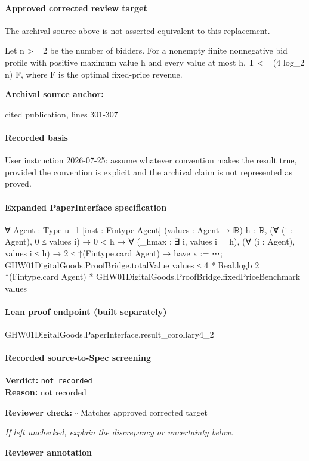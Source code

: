 \documentclass[10pt]{article}
\newcommand{\reviewerbox}{%
  \par\noindent\fbox{\parbox{0.96\linewidth}{\rule{0pt}{0.38in}}}\par
}
\newcommand{\reviewmatch}[1]{%
  \par\noindent\textbf{Reviewer check:} $\square$\; #1\par
  \noindent\emph{If left unchecked, explain the discrepancy or uncertainty below.}\par
}
\begin{document}
\paragraph{Approved corrected review target}
The archival source above is not asserted equivalent to this replacement.
\begin{ReviewVerbatim}
Let n >= 2 be the number of bidders. For a nonempty finite nonnegative bid profile with positive maximum value h and every value at most h, T <= (4 log_2 n) F, where F is the optimal fixed-price revenue.
\end{ReviewVerbatim}

\textbf{Archival source anchor:} {\footnotesize\raggedright cited publication, lines 301-\allowbreak{}307\par}
\paragraph{Recorded basis}
User instruction 2026-\allowbreak{}07-\allowbreak{}25:\allowbreak{} assume whatever convention makes the result true, provided the convention is explicit and the archival claim is not represented as proved.\allowbreak{}
\paragraph{Expanded PaperInterface specification}
\begin{ReviewVerbatim}
∀ {Agent : Type u_1} [inst : Fintype Agent] (values : Agent → ℝ) {h : ℝ},
  (∀ (i : Agent), 0 ≤ values i) →
    0 < h →
      ∀ (_hmax : ∃ i, values i = h),
        (∀ (i : Agent), values i ≤ h) →
          2 ≤ ↑(Fintype.card Agent) →
            have x := ⋯;
            GHW01DigitalGoods.ProofBridge.totalValue values ≤
              4 * Real.logb 2 ↑(Fintype.card Agent) * GHW01DigitalGoods.ProofBridge.fixedPriceBenchmark values
\end{ReviewVerbatim}

\paragraph{Lean proof endpoint (built separately)}\begin{ReviewVerbatim}
GHW01DigitalGoods.PaperInterface.result_corollary4_2
\end{ReviewVerbatim}

\paragraph{Recorded source-to-Spec screening}
\textbf{Verdict:} \texttt{not recorded}
\\
\textbf{Reason:} not recorded
\reviewmatch{Matches approved corrected target}
\noindent\textbf{Reviewer annotation}\par
\reviewerbox
\clearpage
\hypertarget{source-claim-de03b129c03015d1}{}
\end{document}
